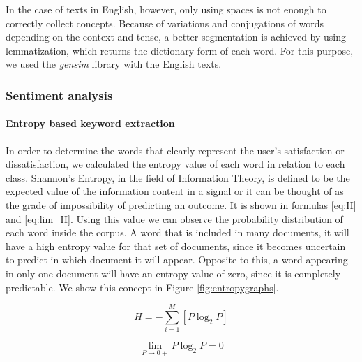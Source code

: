 \documentclass[review]{elsarticle}
\newcommand{\myparagraph}[1]{\paragraph{#1}\mbox{}\smallskip}
\begin{document}
In the case of texts in English, however, only using spaces is not enough to correctly collect concepts. Because of variations and conjugations of words depending on the context and tense, a better segmentation is achieved by using lemmatization, which returns the dictionary form of each word. For this purpose, we used the \textit{gensim} library with the English texts.

\subsubsection{Sentiment analysis}\label{sentimentanalysis}

\myparagraph{Entropy based keyword extraction}\label{entropy}

In order to determine the words that clearly represent the user’s satisfaction or dissatisfaction, we calculated the entropy value of each word in relation to each class. Shannon’s Entropy, in the field of Information Theory, is defined to be the expected value of the information content in a signal \cite[][]{shannon1948} or it can be thought of as the grade of impossibility of predicting an outcome. It is shown in formulas \ref{eq:H} and \ref{eq:lim_H}. Using this value we can observe the probability distribution of each word inside the corpus. A word that is included in many documents, it will have a high entropy value for that set of documents, since it becomes uncertain to predict in which document it will appear. Opposite to this, a word appearing in only one document will have an entropy value of zero, since it is completely predictable. We show this concept in Figure \ref{fig:entropygraphs}.

\begin{equation}\label{eq:H}
H = - \sum_{i=1}^M [P \log_2 P]
\end{equation}

\begin{equation}\label{eq:lim_H}
\lim_{P\to0+} P \log_2 P = 0
\end{equation}
\end{document}
